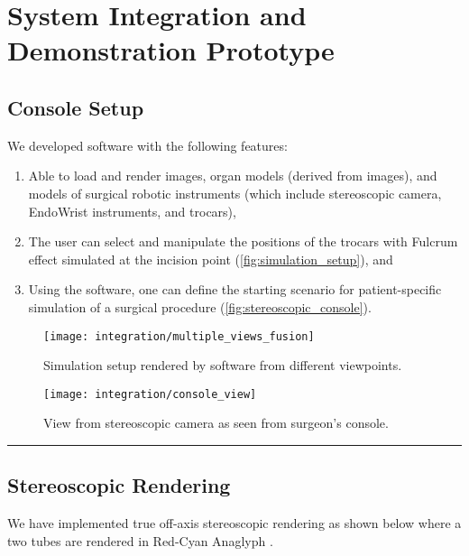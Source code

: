 
\section{System Integration and Demonstration Prototype}\label{sec:system_integration}

\subsection{Console Setup}\label{ssec:console_setup}
We developed software with the following features:
\begin{enumerate}
  \item Able to load and render  images, organ models (derived from  images), and  models of surgical robotic instruments (which include stereoscopic camera, EndoWrist instruments, and trocars),
  \item The user can select and manipulate the positions of the trocars with Fulcrum effect simulated at the incision point (\autoref{fig:simulation_setup}), and
  \item Using the software, one can define the starting scenario for patient-specific simulation of a surgical procedure (\autoref{fig:stereoscopic_console}).
\end{enumerate}

\begin{figure}
  \centering%
  \texttt{[image: integration/multiple\_views\_fusion]}
  \caption{Simulation setup rendered by software from different viewpoints.}\label{fig:simulation_setup}
\end{figure}

\begin{figure}
  \centering%
  \texttt{[image: integration/console\_view]}
  \caption{View from stereoscopic camera as seen from surgeon’s console.}\label{fig:stereoscopic_console}
\end{figure}

\hrule%

\subsection{Stereoscopic Rendering}\label{ssec:stereo_rendering}

We have implemented true off-axis stereoscopic rendering as shown below where a two tubes are rendered in Red-Cyan Anaglyph .

